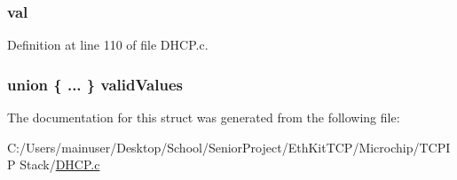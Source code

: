\subsubsection[{val}]{ val}\label{struct_d_h_c_p___c_l_i_e_n_t___v_a_r_s_a5986ea8162aa0f6608b36b20964044dd}


Definition at line 110 of file D\+H\+C\+P.\+c.

\hypertarget{struct_d_h_c_p___c_l_i_e_n_t___v_a_r_s_aac5486c73ada70d2692a5e4d89ec3028}{}
\subsubsection[{valid\+Values}]{\setlength{\rightskip}{0pt plus 5cm}union \{ ... \}   valid\+Values}\label{struct_d_h_c_p___c_l_i_e_n_t___v_a_r_s_aac5486c73ada70d2692a5e4d89ec3028}


The documentation for this struct was generated from the following file\+:\begin{DoxyCompactItemize}
\item 
C\+:/\+Users/mainuser/\+Desktop/\+School/\+Senior\+Project/\+Eth\+Kit\+T\+C\+P/\+Microchip/\+T\+C\+P\+I\+P Stack/\hyperlink{_d_h_c_p_8c}{D\+H\+C\+P.\+c}\end{DoxyCompactItemize}
